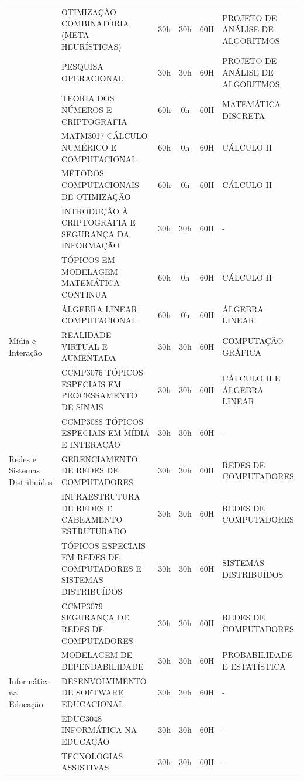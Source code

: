 \begin{center}
\begin{tiny}
\begin{longtable}{p{2.5cm}p{5.5cm}cccp{3.3cm}}
    & OTIMIZAÇÃO COMBINATÓRIA (META-HEURÍSTICAS) & 30h & 30h & 60H & PROJETO DE ANÁLISE DE ALGORITMOS \\ \cline{2-6}
    & PESQUISA OPERACIONAL & 30h & 30h & 60H & PROJETO DE ANÁLISE DE ALGORITMOS \\ \cline{2-6}
    & TEORIA DOS NÚMEROS E CRIPTOGRAFIA & 60h & 0h & 60H & MATEMÁTICA DISCRETA \\ \cline{2-6}
    & MATM3017 CÁLCULO NUMÉRICO E COMPUTACIONAL & 60h & 0h & 60H & CÁLCULO II \\ \cline{2-6}
    & MÉTODOS COMPUTACIONAIS DE OTIMIZAÇÃO & 60h & 0h & 60H & CÁLCULO II \\ \cline{2-6}
    & INTRODUÇÃO À CRIPTOGRAFIA E SEGURANÇA DA INFORMAÇÃO & 30h & 30h & 60H & - \\ \cline{2-6}
    & TÓPICOS EM MODELAGEM MATEMÁTICA CONTINUA & 60h & 0h & 60H & CÁLCULO II \\ \cline{2-6}
    & ÁLGEBRA LINEAR COMPUTACIONAL & 60h & 0h & 60H & ÁLGEBRA LINEAR \\ \midrule
  Mídia e Interação & REALIDADE VIRTUAL E AUMENTADA & 30h & 30h & 60H & COMPUTAÇÃO GRÁFICA \\ \cline{2-6}
    & CCMP3076 TÓPICOS ESPECIAIS EM PROCESSAMENTO DE SINAIS & 30h & 30h & 60H & CÁLCULO II E ÁLGEBRA LINEAR \\ \cline{2-6}
    & CCMP3088 TÓPICOS ESPECIAIS EM MÍDIA E INTERAÇÃO & 30h & 30h & 60H & - \\ \midrule
  Redes e Sistemas Distribuídos & GERENCIAMENTO DE REDES DE COMPUTADORES & 30h & 30h & 60H & REDES DE COMPUTADORES \\ \cline{2-6}
    & INFRAESTRUTURA DE REDES E CABEAMENTO ESTRUTURADO & 30h & 30h & 60H & REDES DE COMPUTADORES \\ \cline{2-6}
    & TÓPICOS ESPECIAIS EM REDES DE COMPUTADORES E SISTEMAS DISTRIBUÍDOS & 30h & 30h & 60H & SISTEMAS DISTRIBUÍDOS \\ \cline{2-6}
    & CCMP3079 SEGURANÇA DE REDES DE COMPUTADORES & 30h & 30h & 60H & REDES DE COMPUTADORES \\ \cline{2-6}
    & MODELAGEM DE DEPENDABILIDADE  & 30h & 30h & 60H & PROBABILIDADE E ESTATÍSTICA \\ \midrule
  Informática na Educação & DESENVOLVIMENTO DE SOFTWARE EDUCACIONAL & 30h & 30h & 60H & - \\ \cline{2-6}
    & EDUC3048 INFORMÁTICA NA EDUCAÇÃO & 30h & 30h & 60H & - \\ \cline{2-6}
    & TECNOLOGIAS ASSISTIVAS & 30h & 30h & 60H & - \\ \cline{2-6}

\end{longtable}
\end{tiny}
\end{center}
